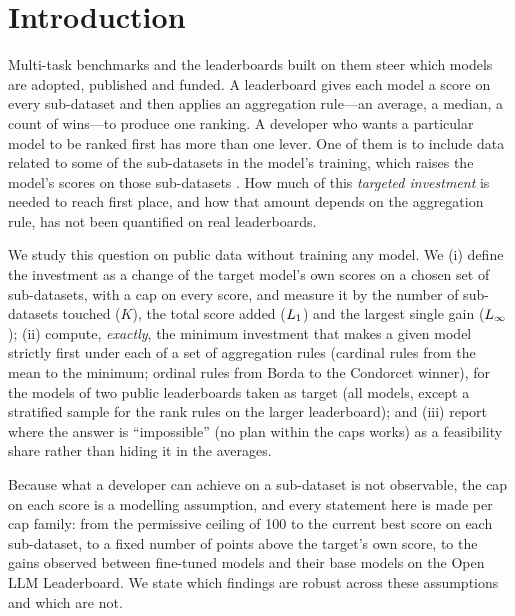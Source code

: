 \section{Introduction}
\label{sec:intro}

Multi-task benchmarks and the leaderboards built on them steer which models are adopted, published and funded. A leaderboard gives each model a score on every sub-dataset and then applies an aggregation rule---an average, a median, a count of wins---to produce one ranking. A developer who wants a particular model to be ranked first has more than one lever. One of them is to include data related to some of the sub-datasets in the model's training, which raises the model's scores on those sub-datasets \citep{zhou2023cheater,yang2023rephrased}. How much of this \emph{targeted investment} is needed to reach first place, and how that amount depends on the aggregation rule, has not been quantified on real leaderboards.

We study this question on public data without training any model. We (i) define the investment as a change of the target model's own scores on a chosen set of sub-datasets, with a cap on every score, and measure it by the number of sub-datasets touched ($K$), the total score added ($L_1$) and the largest single gain ($L_\infty$); (ii) compute, \emph{exactly}, the minimum investment that makes a given model strictly first under each of a set of aggregation rules (cardinal rules from the mean to the minimum; ordinal rules from Borda to the Condorcet winner), for the models of two public leaderboards taken as target (all models, except a stratified sample for the rank rules on the larger leaderboard); and (iii) report where the answer is ``impossible'' (no plan within the caps works) as a feasibility share rather than hiding it in the averages.

Because what a developer can achieve on a sub-dataset is not observable, the cap on each score is a modelling assumption, and every statement here is made per cap family: from the permissive ceiling of 100 to the current best score on each sub-dataset, to a fixed number of points above the target's own score, to the gains observed between fine-tuned models and their base models on the Open LLM Leaderboard. We state which findings are robust across these assumptions and which are not.


